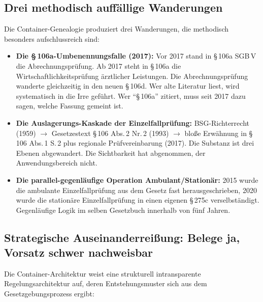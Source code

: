 \documentclass{umbruch-position}
\begin{document}
\subsection{Drei methodisch auffällige Wanderungen}

Die Container-Genealogie produziert drei Wanderungen, die methodisch besonders aufschlussreich sind:

\begin{itemize}[nosep]
  \item \textbf{Die \S\,106a-Umbenennungsfalle (2017):} Vor 2017 stand in \S\,106a SGB\,V die Abrechnungsprüfung. Ab 2017 steht in \S\,106a die Wirtschaftlichkeitsprüfung ärztlicher Leistungen. Die Abrechnungsprüfung wanderte gleichzeitig in den neuen \S\,106d. Wer alte Literatur liest, wird systematisch in die Irre geführt. Wer ``\S\,106a'' zitiert, muss seit 2017 dazu sagen, welche Fassung gemeint ist.
  \item \textbf{Die Auslagerungs-Kaskade der Einzelfallprüfung:} BSG-Richterrecht (1959) $\to$ Gesetzestext \S\,106 Abs.\,2 Nr.\,2 (1993) $\to$ bloße Erwähnung in \S\,106 Abs.\,1 S.\,2 plus regionale Prüfvereinbarung (2017). Die Substanz ist drei Ebenen abgewandert. Die Sichtbarkeit hat abgenommen, der Anwendungsbereich nicht.
  \item \textbf{Die parallel-gegenläufige Operation Ambulant/Stationär:} 2015 wurde die ambulante Einzelfallprüfung aus dem Gesetz fast herausgeschrieben, 2020 wurde die stationäre Einzelfallprüfung in einen eigenen \S\,275c verselbständigt. Gegenläufige Logik im selben Gesetzbuch innerhalb von fünf Jahren.
\end{itemize}

\subsection{Strategische Auseinanderreißung: Belege ja, Vorsatz schwer nachweisbar}

Die Container-Architektur weist eine strukturell intransparente Regelungsarchitektur auf, deren Entstehungsmuster sich aus dem Gesetzgebungsprozess ergibt:
\end{document}
